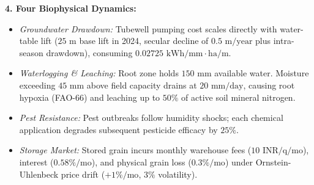 \documentclass[10pt,twocolumn]{article}
\begin{document}
\textbf{4. Four Biophysical Dynamics:}
\begin{itemize}
    \item \textit{Groundwater Drawdown:} Tubewell pumping cost scales directly with water-table lift ($25\text{ m}$ base lift in 2024, secular decline of $0.5\text{ m/year}$ plus intra-season drawdown), consuming $0.02725\text{ kWh/mm}\cdot\text{ha/m}$.
    \item \textit{Waterlogging \& Leaching:} Root zone holds $150\text{ mm}$ available water. Moisture exceeding $45\text{ mm}$ above field capacity drains at $20\text{ mm/day}$, causing root hypoxia (FAO-66) and leaching up to $50\%$ of active soil mineral nitrogen.
    \item \textit{Pest Resistance:} Pest outbreaks follow humidity shocks; each chemical application degrades subsequent pesticide efficacy by $25\%$.
    \item \textit{Storage Market:} Stored grain incurs monthly warehouse fees ($10\text{ INR/q/mo}$), interest ($0.58\%/\text{mo}$), and physical grain loss ($0.3\%/\text{mo}$) under Ornstein-Uhlenbeck price drift ($+1\%/\text{mo}$, $3\%$ volatility).
\end{itemize}
\end{document}
